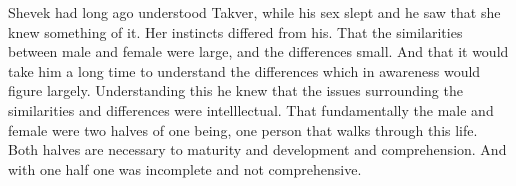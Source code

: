 Shevek had long ago understood Takver, while his sex slept and he saw
that she knew something of it.  Her instincts differed from his.  That
the similarities between male and female were large, and the
differences small.  And that it would take him a long time to
understand the differences which in awareness would figure largely.
Understanding this he knew that the issues surrounding the
similarities and differences were intelllectual.  That fundamentally
the male and female were two halves of one being, one person that
walks through this life.  Both halves are necessary to maturity and
development and comprehension.  And with one half one was incomplete
and not comprehensive.

\bye

